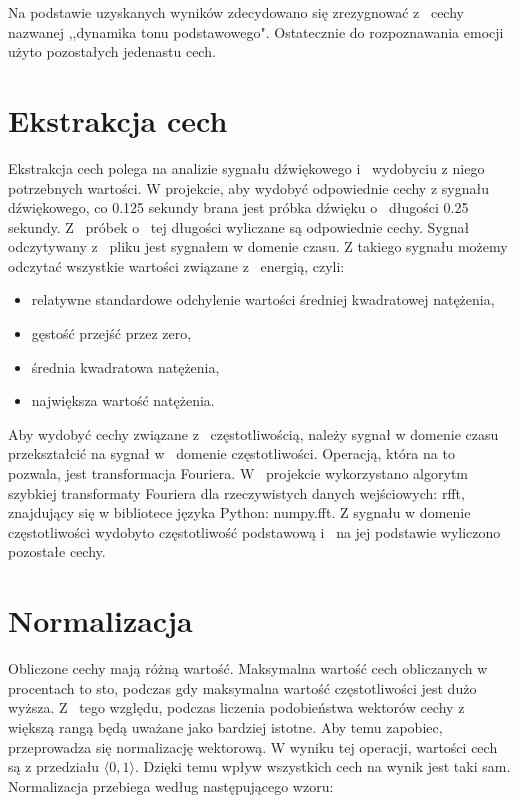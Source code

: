 \documentclass[declaration,shortabstract]{iithesis}
\begin{document}
Na podstawie uzyskanych wyników zdecydowano się zrezygnować z~ cechy nazwanej ,,dynamika tonu podstawowego". Ostatecznie do rozpoznawania emocji użyto pozostałych jedenastu cech.

\section{Ekstrakcja cech}

Ekstrakcja cech polega na analizie sygnału dźwiękowego i~ wydobyciu z niego potrzebnych wartości. W projekcie, aby wydobyć odpowiednie cechy z sygnału dźwiękowego, co 0.125 sekundy brana jest próbka dźwięku o~ długości 0.25 sekundy. Z~ próbek o~ tej długości wyliczane są odpowiednie cechy. Sygnał odczytywany z~ pliku jest sygnałem w domenie czasu. Z takiego sygnału możemy odczytać wszystkie wartości związane z~ energią, czyli:
\begin{itemize}
\item relatywne standardowe odchylenie wartości średniej kwadratowej natężenia,
\item gęstość przejść przez zero,
\item średnia kwadratowa natężenia, 
\item największa wartość natężenia.
\end{itemize}

Aby wydobyć cechy związane z~ częstotliwością, należy sygnał w domenie czasu przekształcić na sygnał w~ domenie częstotliwości. Operacją, która na to pozwala, jest transformacja Fouriera. W~ projekcie wykorzystano algorytm szybkiej transformaty Fouriera dla rzeczywistych danych wejściowych: rfft, znajdujący się w bibliotece języka Python: numpy.fft. Z sygnału w domenie częstotliwości wydobyto częstotliwość podstawową i~ na jej podstawie wyliczono pozostałe cechy.

\section{Normalizacja}

Obliczone cechy mają różną wartość. Maksymalna wartość cech obliczanych w~ procentach to sto, podczas gdy maksymalna wartość częstotliwości jest dużo wyższa. Z~ tego względu, podczas liczenia podobieństwa wektorów cechy z~ większą rangą będą uważane jako bardziej istotne. Aby temu zapobiec, przeprowadza się normalizację wektorową. W wyniku tej operacji, wartości cech są z przedziału $\langle0,1\rangle$. Dzięki temu wpływ wszystkich cech na wynik jest taki sam. Normalizacja przebiega według następującego wzoru:
\end{document}
